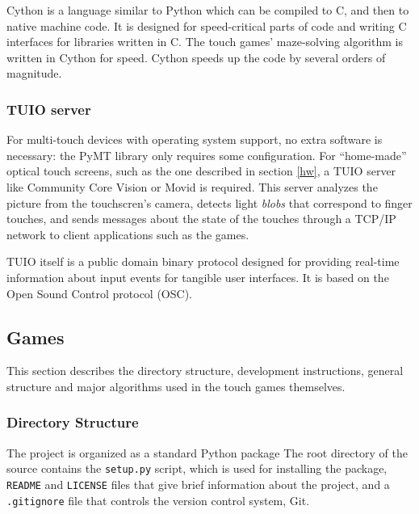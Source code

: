 \documentclass[a4paper,11pt]{article}
\begin{document}
Cython is a language similar to Python which can be compiled to C, and then to
native machine code.
It is designed for speed-critical parts of code and writing C interfaces
for libraries written in C.
The touch games' maze-solving algorithm is written in Cython for speed.
Cython speeds up the code by several orders of magnitude.

\subsubsection{TUIO server}


For multi-touch devices with operating system support, no extra
software is necessary: the PyMT library only requires some configuration.
For “home-made” optical touch screens, such as the
one described in section \ref{hw}, a TUIO server like Community Core Vision
or Movid is required.
This server analyzes the picture from the touchscren's camera, detects light
\emph{blobs} that correspond to finger touches, and sends messages about the
state of the touches through a TCP/IP network to client applications such as
the games.

TUIO itself is a public domain binary protocol designed for providing real-time
information about input events for tangible user interfaces.
It is based on the Open Sound Control protocol (OSC).

\subsection{Games}

This section describes the directory structure, development instructions,
general structure and major algorithms used in the touch games themselves.

\subsubsection{Directory Structure}

The project is organized as a standard Python package
The root directory of the source contains the \texttt{setup.py} script, which
is used for installing the package, \texttt{README} and \texttt{LICENSE} files
that give brief information about the project, and a \texttt{.gitignore} file
that controls the version control system, Git.
\end{document}
